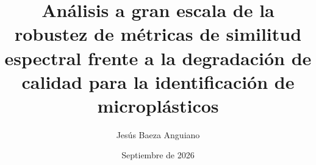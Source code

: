 \newcommand{\Escuela}{ESCUELA DE ARQUITECTURA, INGENIERÍA Y DISEÑO}

\newcommand{\Titulacion}{MÁSTER UNIVERSITARIO EN ANÁLISIS DE DATOS MASIVOS (BIG DATA)}

\newcommand{\Tipo}{TRABAJO FIN DE MÁSTER}

\newcommand{\Titulo}{Análisis a gran escala de la robustez de métricas de similitud espectral frente a la degradación de calidad para la identificación de microplásticos}

\newcommand{\TituloCaps}{ANÁLISIS A GRAN ESCALA DE LA ROBUSTEZ DE MÉTRICAS DE SIMILITUD ESPECTRAL FRENTE A LA DEGRADACIÓN DE CALIDAD PARA LA IDENTIFICACIÓN DE MICROPLÁSTICOS}

\newcommand{\NombreAutor}{Jesús Baeza Anguiano}

\newcommand{\NombreAutorCaps}{JESÚS BAEZA ANGUIANO}

\newcommand{\NombreTutor}{Nico Coca López}

\newcommand{\Fecha}{Septiembre de 2026}

\newcommand{\Curso}{CURSO 2025 - 2026}

\title{\Titulo}
\author{\NombreAutor}
\date{\Fecha}
